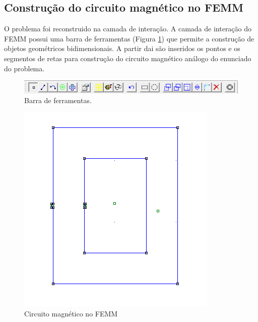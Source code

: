 \subsection{Construção do circuito magnético no FEMM}
O problema foi reconstruido na camada de interação. A camada de interação do FEMM possui uma barra de ferramentas (Figura \ref{ferramentas}) que permite a construção de objetos geométricos bidimensionais. A partir dai são inseridos os pontos e os segmentos de retas para construção do circuito magnético análogo do enunciado do problema.
\begin{figure}[H]
\centering
\includegraphics[scale=1]{img/assig1/ferram.png}
\caption[Barra de ferramentas]{Barra de ferramentas.}
\label{ferramentas}
\end{figure}

\begin{figure}[H]
\centering
\includegraphics[scale=0.65]{img/assig1/circ_mag1.png}
\caption[Circuito magnético no FEMM]{Circuito magnético no FEMM}
\label{circ_mag}
\end{figure}

